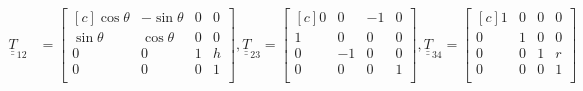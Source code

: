 \documentclass[onecolumn,10pt]{jhwhw}
\def\du#1{\underline{\underline{#1}}}
\begin{document}
\begin{align*}
\du{T}_{12} &=
\begin{bmatrix*}[c]
\cos\theta & -\sin\theta & 0 & 0 \\
\sin\theta &  \cos\theta & 0 & 0 \\
         0 &           0 & 1 & h \\
         0 &           0 & 0 & 1 \\
\end{bmatrix*},
\du{T}_{23} =
\begin{bmatrix*}[c]
0 &  0 & -1 & 0 \\
1 &  0 &  0 & 0 \\
0 & -1 &  0 & 0 \\
0 &  0 &  0 & 1 \\
\end{bmatrix*},
\du{T}_{34} =
\begin{bmatrix*}[c]
1 & 0 & 0 & 0 \\
0 & 1 & 0 & 0 \\
0 & 0 & 1 & r \\
0 & 0 & 0 & 1 \\
\end{bmatrix*}
\end{align*}
\end{document}
